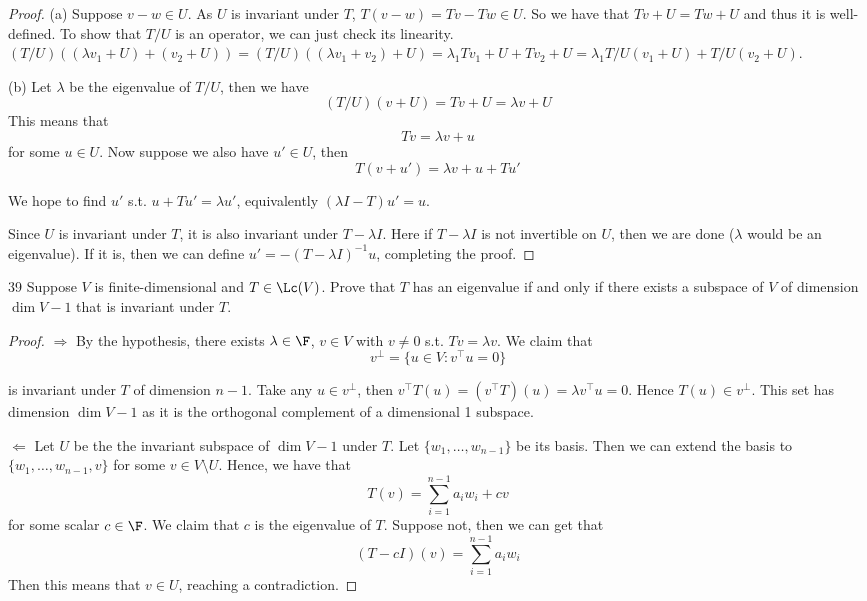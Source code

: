 \documentclass{extarticle}
\begin{document}
\begin{proof}
(a) Suppose \(v - w \in U\). As \(U\) is invariant under \(T\), \(T(v - w) = Tv - Tw \in U\). 
So we have that \(Tv + U = Tw + U\) and thus it is well-defined. To show that \(T/U\) is an operator, 
we can just check its linearity. \((T/U)( (\lambda v_1 + U) + (v_2 + U)  ) 
= (T/U)((\lambda v_1 + v_2) + U) = \lambda_1 Tv_1 + U + T v_2 + U = \lambda_1 T/U(v_1 + U) 
+ T/U (v_2 + U)\). 

(b) Let \(\lambda\) be the eigenvalue of \(T/U\), then we have 
\[(T/U)(v+U) = Tv + U = \lambda v + U\]
This means that 
\[Tv = \lambda v + u\]
for some \(u \in U\). Now suppose we also have \(u' \in U\), then 
\[T(v + u') = \lambda v + u + Tu'\]

We hope to find \(u'\) s.t. \(u + Tu' = \lambda u'\), equivalently \((\lambda I - T)u' = u\).

Since \(U\) is invariant under \(T\), it is also invariant under \(T - \lambda I\). Here 
if \(T - \lambda I\) is not invertible on \(U\), then we are done (\(\lambda\) would be 
an eigenvalue). If it is, then we can define \(u' = -(T - \lambda I)^{-1}u\), completing the proof.
\end{proof}

\begin{problem}{39}
    Suppose \(V\) is finite-dimensional and \(T \in \Lc(V)\). Prove that \(T\) has an eigenvalue 
    if and only if there exists a subspace of \(V\) of dimension \(\dim V -1\) that is invariant 
    under \(T\).
\end{problem}

\begin{proof}

\(\Rightarrow\) By the hypothesis, there exists \(\lambda \in \F\), \(v \in V\) with \(v \neq 0\) s.t. 
\(Tv = \lambda v\). We claim that 
\[v^\perp = \{u \in V \colon v^\top u = 0\}\]

is invariant under \(T\) of dimension \(n - 1\). Take any \(u \in v^\perp\), then 
\(v^\top T(u) = (v^\top T)(u) = \lambda v^\top u = 0\). Hence \(T(u) \in v^\perp\). This set has 
dimension \(\dim V - 1\) as it is the orthogonal complement of a dimensional 1 subspace. 

\(\Leftarrow\) Let \(U\) be the the invariant subspace of \(\dim V - 1\) under \(T\). Let 
\(\{w_1, \ldots, w_{n-1}\}\) be its basis. Then we can extend the basis to \(\{w_1, \ldots, w_{n-1}, v\}\)
for some \(v \in V \setminus U\). Hence, we have that 
\[T(v) = \sum_{i=1}^{n-1} a_i w_i + c v\]
for some scalar \(c \in \F\). We claim that \(c\) is the eigenvalue of \(T\). Suppose not, then we can get that 
\[(T - cI)(v) = \sum_{i=1}^{n-1} a_i w_i\]
Then this means that \(v \in U\), reaching a contradiction.
\end{proof}
\end{document}
